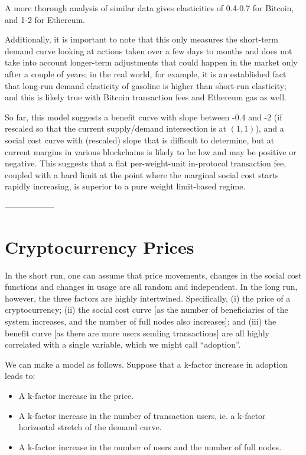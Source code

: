 \documentclass[12pt, final]{article}
\begin{document}
A more thorough analysis of similar data\cite{demand-elasticity} gives elasticities of 0.4-0.7 for Bitcoin, and 1-2 for Ethereum.

Additionally, it is important to note that this only measures the short-term demand curve looking at actions taken over a few days to months and does not take into account longer-term adjustments that could happen in the market only after a couple of years; in the real world, for example, it is an established fact that long-run demand elasticity of gasoline is higher than short-run elasticity\cite{env-econ}; and this is likely true with Bitcoin transaction fees and Ethereum gas as well.

So far, this model suggests a benefit curve with slope between -0.4 and -2 (if rescaled so that the current supply/demand intersection is at $(1, 1)$), and a social cost curve with (rescaled) slope that is difficult to determine, but at current margins in various blockchains is likely to be low and may be positive or negative. This suggests that a flat per-weight-unit in-protocol transaction fee, coupled with a hard limit at the point where the marginal social cost starts rapidly increasing, is superior to a pure weight limit-based regime.

------------------

\section{Cryptocurrency Prices}

In the short run, one can assume that price movements, changes in the social cost functions and changes in usage are all random and independent. In the long run, however, the three factors are highly intertwined. Specifically, (i) the price of a cryptocurrency; (ii) the social cost curve [as the number of beneficiaries of the system increases, and the number of full nodes also increases]; and (iii) the benefit curve [as there are more users sending transactions] are all highly correlated with a single variable, which we might call ``adoption''.

We can make a model as follows. Suppose that a k-factor increase in adoption leads to:

\begin{itemize}
    \item A k-factor increase in the price.
    \item A k-factor increase in the number of transaction users, ie. a k-factor horizontal stretch of the demand curve.
    \item A k-factor increase in the number of users and the number of full nodes.
\end{itemize}
\end{document}
